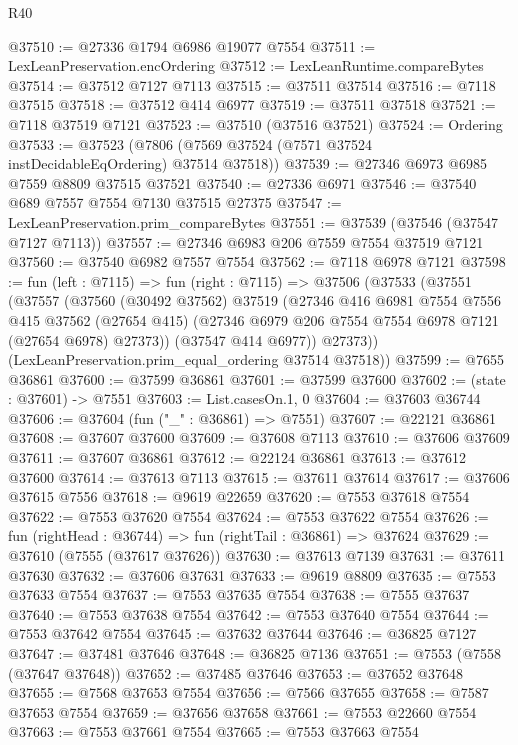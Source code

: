 \begin{lexlean}{R40}
\begin{coremodule}
@37510 := @27336 @1794 @6986 @19077 @7554
@37511 := LexLeanPreservation.encOrdering
@37512 := LexLeanRuntime.compareBytes
@37514 := @37512 @7127 @7113
@37515 := @37511 @37514
@37516 := @7118 @37515
@37518 := @37512 @414 @6977
@37519 := @37511 @37518
@37521 := @7118 @37519 @7121
@37523 := @37510 (@37516 @37521)
@37524 := Ordering
@37533 := @37523 (@7806 (@7569 @37524 (@7571 @37524 instDecidableEqOrdering) @37514 @37518))
@37539 := @27346 @6973 @6985 @7559 @8809 @37515 @37521
@37540 := @27336 @6971
@37546 := @37540 @689 @7557 @7554 @7130 @37515 @27375
@37547 := LexLeanPreservation.prim_compareBytes
@37551 := @37539 (@37546 (@37547 @7127 @7113))
@37557 := @27346 @6983 @206 @7559 @7554 @37519 @7121
@37560 := @37540 @6982 @7557 @7554
@37562 := @7118 @6978 @7121
@37598 := fun (left : @7115) =>
  fun (right : @7115) =>
  @37506
    (@37533
      (@37551
        (@37557
          (@37560
            (@30492 @37562)
            @37519
            (@27346
              @416
              @6981
              @7554
              @7556
              @415
              @37562
              (@27654 @415)
              (@27346 @6979 @206 @7554 @7554 @6978 @7121 (@27654 @6978) @27373))
            (@37547 @414 @6977))
          @27373))
      (LexLeanPreservation.prim_equal_ordering @37514 @37518))
@37599 := @7655 @36861
@37600 := @37599 @36861
@37601 := @37599 @37600
@37602 := (state : @37601) -> @7551
@37603 := List.casesOn.{1, 0}
@37604 := @37603 @36744
@37606 := @37604 (fun ("_" : @36861) => @7551)
@37607 := @22121 @36861
@37608 := @37607 @37600
@37609 := @37608 @7113
@37610 := @37606 @37609
@37611 := @37607 @36861
@37612 := @22124 @36861
@37613 := @37612 @37600
@37614 := @37613 @7113
@37615 := @37611 @37614
@37617 := @37606 @37615 @7556
@37618 := @9619 @22659
@37620 := @7553 @37618 @7554
@37622 := @7553 @37620 @7554
@37624 := @7553 @37622 @7554
@37626 := fun (rightHead : @36744) => fun (rightTail : @36861) => @37624
@37629 := @37610 (@7555 (@37617 @37626))
@37630 := @37613 @7139
@37631 := @37611 @37630
@37632 := @37606 @37631
@37633 := @9619 @8809
@37635 := @7553 @37633 @7554
@37637 := @7553 @37635 @7554
@37638 := @7555 @37637
@37640 := @7553 @37638 @7554
@37642 := @7553 @37640 @7554
@37644 := @7553 @37642 @7554
@37645 := @37632 @37644
@37646 := @36825 @7127
@37647 := @37481 @37646
@37648 := @36825 @7136
@37651 := @7553 (@7558 (@37647 @37648))
@37652 := @37485 @37646
@37653 := @37652 @37648
@37655 := @7568 @37653 @7554
@37656 := @7566 @37655
@37658 := @7587 @37653 @7554
@37659 := @37656 @37658
@37661 := @7553 @22660 @7554
@37663 := @7553 @37661 @7554
@37665 := @7553 @37663 @7554

\end{coremodule}
\end{lexlean}

